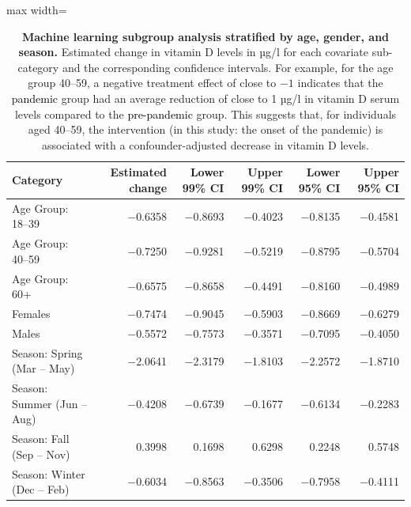 \documentclass[12pt]{article}
\newcommand{\REV}[1]{\textcolor{black}{#1}}
\begin{document}
\begin{appendices}
\newpage

\begin{table}
    \centering
\caption[Machine learning subgroup analysis stratified by age, gender, and season]{\textbf{Machine learning subgroup analysis stratified by age, gender, and season.} Estimated change in vitamin D levels in µg/l for each covariate sub-category and the corresponding confidence intervals. For example, for the age group 40--59, a negative treatment effect of close to $-1$ indicates that the \REV{pandemic} group had an average reduction of close to 1 µg/l in vitamin D serum levels compared to the \REV{pre-pandemic} group. This suggests that, for individuals aged 40--59, the intervention (in this study: the onset of the pandemic) is associated with a confounder-adjusted decrease in vitamin D levels.}
\label{supptab:subgroups}
\footnotesize
\begin{adjustbox}{max width=\textwidth}
    \begin{tabular}{|l|r|r|r|r|r|}
    \hline
    \rowcolor{orange!20} \textbf{Category} & \textbf{Estimated change} & \textbf{Lower 99\% CI} & \textbf{Upper 99\% CI} & \textbf{Lower 95\% CI} & \textbf{Upper 95\% CI} \\ \hline
    Age Group: 18--39 & $-$0.6358 & $-$0.8693 & $-$0.4023 & $-$0.8135 & $-$0.4581 \\ \hline
    Age Group: 40--59 & $-$0.7250 & $-$0.9281 & $-$0.5219 & $-$0.8795 & $-$0.5704 \\ \hline
    Age Group: 60+    & $-$0.6575 & $-$0.8658 & $-$0.4491 & $-$0.8160 & $-$0.4989 \\ \hline
    Females           & $-$0.7474 & $-$0.9045 & $-$0.5903 & $-$0.8669 & $-$0.6279 \\ \hline
    Males             & $-$0.5572 & $-$0.7573 & $-$0.3571 & $-$0.7095 & $-$0.4050 \\ \hline
    Season: Spring (Mar -- May)    & $-$2.0641 & $-$2.3179 & $-$1.8103 & $-$2.2572 & $-$1.8710 \\ \hline
    Season: Summer (Jun -- Aug)    & $-$0.4208 & $-$0.6739 & $-$0.1677 & $-$0.6134 & $-$0.2283 \\ \hline
    Season: Fall (Sep -- Nov)      & 0.3998    & 0.1698    & 0.6298    & 0.2248    & 0.5748    \\ \hline
    Season: Winter (Dec -- Feb)    & $-$0.6034 & $-$0.8563 & $-$0.3506 & $-$0.7958 & $-$0.4111 \\ \hline
    \end{tabular}
    \end{adjustbox}


\end{table}
\end{appendices}
\end{document}
